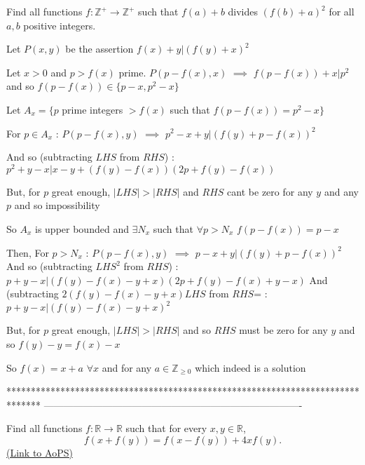 


\begin{solution}
	\begin{tcolorbox}Find all functions $f:\mathbb{Z^+}\rightarrow\mathbb{Z^+}$ such that $f(a)+b$ divides $(f(b)+a)^2$ for all $a,b$ positive integers.\end{tcolorbox}
Let $P(x,y)$ be the assertion $f(x)+y|(f(y)+x)^2$

Let $x>0$ and $p>f(x)$ prime. $P(p-f(x),x)$ $\implies$ $f(p-f(x))+x|p^2$ and so $f(p-f(x))\in\{p-x,p^2-x\}$

Let $A_x=\{p$ prime integers $>f(x)$ such that $f(p-f(x))=p^2-x\}$

For $p\in A_x$ : $P(p-f(x),y)$ $\implies$ $p^2-x+y|(f(y)+p-f(x))^2$

And so (subtracting $LHS$ from $RHS$) : $p^2+y-x|x-y+(f(y)-f(x))(2p+f(y)-f(x))$

But, for $p$ great enough, $|LHS|>|RHS|$ and $RHS$ cant be zero for any $y$ and any $p$ and so impossibility

So $A_x$ is upper bounded and $\exists N_x$ such that $\forall p>N_x$ $f(p-f(x))=p-x$

Then, For $p>N_x$ : $P(p-f(x),y)$ $\implies$ $p-x+y|(f(y)+p-f(x))^2$
And so (subtracting $LHS^2$ from $RHS$) : $p+y-x|(f(y)-f(x)-y+x)(2p+f(y)-f(x)+y-x)$
And (subtracting $2(f(y)-f(x)-y+x)LHS$ from $RHS$= : $p+y-x|(f(y)-f(x)-y+x)^2$

But, for $p$ great enough, $|LHS|>|RHS|$ and so $RHS$ must be zero for any $y$ and so $f(y)-y=f(x)-x$

So $\boxed{f(x)=x+a}$ $\forall x$ and for any $a\in\mathbb Z_{\ge 0}$ which indeed is a solution
\end{solution}
*******************************************************************************
-------------------------------------------------------------------------------

\begin{problem}
	Find all functions $f:\mathbb{R}\to\mathbb{R}$ such that for every $x,y\in \mathbb{R}$,
\[f(x+f(y))=f(x-f(y))+4xf(y).\]
	\flushright \href{https://artofproblemsolving.com/community/c6h406379}{(Link to AoPS)}
\end{problem}



